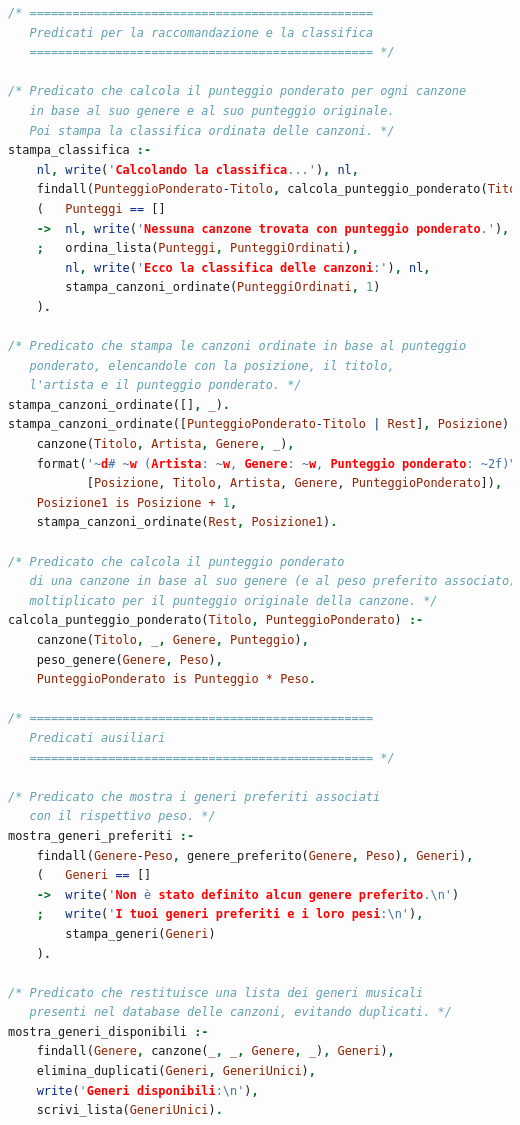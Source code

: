 \documentclass[a4paper,11pt]{article}
\begin{document}
\begin{lstlisting}[language=Prolog]
/* ================================================
   Predicati per la raccomandazione e la classifica
   ================================================ */

/* Predicato che calcola il punteggio ponderato per ogni canzone
   in base al suo genere e al suo punteggio originale.
   Poi stampa la classifica ordinata delle canzoni. */
stampa_classifica :-
    nl, write('Calcolando la classifica...'), nl,
    findall(PunteggioPonderato-Titolo, calcola_punteggio_ponderato(Titolo, PunteggioPonderato), Punteggi),
    (   Punteggi == []
    ->  nl, write('Nessuna canzone trovata con punteggio ponderato.'), nl
    ;   ordina_lista(Punteggi, PunteggiOrdinati),
        nl, write('Ecco la classifica delle canzoni:'), nl,
        stampa_canzoni_ordinate(PunteggiOrdinati, 1)
    ).

/* Predicato che stampa le canzoni ordinate in base al punteggio
   ponderato, elencandole con la posizione, il titolo,
   l'artista e il punteggio ponderato. */
stampa_canzoni_ordinate([], _).
stampa_canzoni_ordinate([PunteggioPonderato-Titolo | Rest], Posizione) :-
    canzone(Titolo, Artista, Genere, _),
    format('~d# ~w (Artista: ~w, Genere: ~w, Punteggio ponderato: ~2f)\n',
           [Posizione, Titolo, Artista, Genere, PunteggioPonderato]),
    Posizione1 is Posizione + 1,
    stampa_canzoni_ordinate(Rest, Posizione1).

/* Predicato che calcola il punteggio ponderato
   di una canzone in base al suo genere (e al peso preferito associato)
   moltiplicato per il punteggio originale della canzone. */
calcola_punteggio_ponderato(Titolo, PunteggioPonderato) :-
    canzone(Titolo, _, Genere, Punteggio),
    peso_genere(Genere, Peso),
    PunteggioPonderato is Punteggio * Peso.

/* ================================================
   Predicati ausiliari
   ================================================ */

/* Predicato che mostra i generi preferiti associati
   con il rispettivo peso. */
mostra_generi_preferiti :-
    findall(Genere-Peso, genere_preferito(Genere, Peso), Generi),
    (   Generi == []
    ->  write('Non è stato definito alcun genere preferito.\n')
    ;   write('I tuoi generi preferiti e i loro pesi:\n'),
        stampa_generi(Generi)
    ).

/* Predicato che restituisce una lista dei generi musicali
   presenti nel database delle canzoni, evitando duplicati. */
mostra_generi_disponibili :-
    findall(Genere, canzone(_, _, Genere, _), Generi),
    elimina_duplicati(Generi, GeneriUnici),
    write('Generi disponibili:\n'),
    scrivi_lista(GeneriUnici).


\end{lstlisting}
\end{document}
